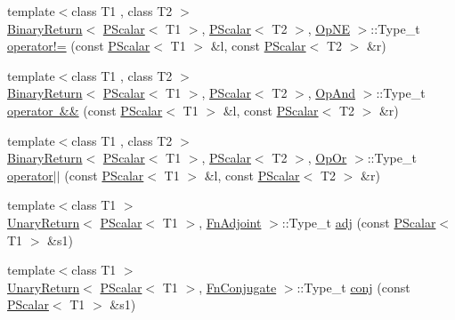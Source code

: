 \begin{DoxyCompactItemize}
\item 
{\footnotesize template$<$class T1 , class T2 $>$ }\\\mbox{\hyperlink{structENSEM_1_1BinaryReturn}{Binary\+Return}}$<$ \mbox{\hyperlink{classENSEM_1_1PScalar}{P\+Scalar}}$<$ T1 $>$, \mbox{\hyperlink{classENSEM_1_1PScalar}{P\+Scalar}}$<$ T2 $>$, \mbox{\hyperlink{structENSEM_1_1OpNE}{Op\+NE}} $>$\+::Type\+\_\+t \mbox{\hyperlink{group__primscalar_ga684a2a9e7e4ca7bc1f740a291a847808}{operator!=}} (const \mbox{\hyperlink{classENSEM_1_1PScalar}{P\+Scalar}}$<$ T1 $>$ \&l, const \mbox{\hyperlink{classENSEM_1_1PScalar}{P\+Scalar}}$<$ T2 $>$ \&r)
\item 
{\footnotesize template$<$class T1 , class T2 $>$ }\\\mbox{\hyperlink{structENSEM_1_1BinaryReturn}{Binary\+Return}}$<$ \mbox{\hyperlink{classENSEM_1_1PScalar}{P\+Scalar}}$<$ T1 $>$, \mbox{\hyperlink{classENSEM_1_1PScalar}{P\+Scalar}}$<$ T2 $>$, \mbox{\hyperlink{structENSEM_1_1OpAnd}{Op\+And}} $>$\+::Type\+\_\+t \mbox{\hyperlink{group__primscalar_ga3853388d3b3d994d263d1da57ffcb055}{operator \&\&}} (const \mbox{\hyperlink{classENSEM_1_1PScalar}{P\+Scalar}}$<$ T1 $>$ \&l, const \mbox{\hyperlink{classENSEM_1_1PScalar}{P\+Scalar}}$<$ T2 $>$ \&r)
\item 
{\footnotesize template$<$class T1 , class T2 $>$ }\\\mbox{\hyperlink{structENSEM_1_1BinaryReturn}{Binary\+Return}}$<$ \mbox{\hyperlink{classENSEM_1_1PScalar}{P\+Scalar}}$<$ T1 $>$, \mbox{\hyperlink{classENSEM_1_1PScalar}{P\+Scalar}}$<$ T2 $>$, \mbox{\hyperlink{structENSEM_1_1OpOr}{Op\+Or}} $>$\+::Type\+\_\+t \mbox{\hyperlink{group__primscalar_ga7955d37fbeaea4b15d725326bfcbc0b1}{operator$\vert$$\vert$}} (const \mbox{\hyperlink{classENSEM_1_1PScalar}{P\+Scalar}}$<$ T1 $>$ \&l, const \mbox{\hyperlink{classENSEM_1_1PScalar}{P\+Scalar}}$<$ T2 $>$ \&r)
\item 
{\footnotesize template$<$class T1 $>$ }\\\mbox{\hyperlink{structENSEM_1_1UnaryReturn}{Unary\+Return}}$<$ \mbox{\hyperlink{classENSEM_1_1PScalar}{P\+Scalar}}$<$ T1 $>$, \mbox{\hyperlink{structENSEM_1_1FnAdjoint}{Fn\+Adjoint}} $>$\+::Type\+\_\+t \mbox{\hyperlink{group__primscalar_ga7014b73d255c4b57001dd68abf3a51c3}{adj}} (const \mbox{\hyperlink{classENSEM_1_1PScalar}{P\+Scalar}}$<$ T1 $>$ \&s1)
\item 
{\footnotesize template$<$class T1 $>$ }\\\mbox{\hyperlink{structENSEM_1_1UnaryReturn}{Unary\+Return}}$<$ \mbox{\hyperlink{classENSEM_1_1PScalar}{P\+Scalar}}$<$ T1 $>$, \mbox{\hyperlink{structENSEM_1_1FnConjugate}{Fn\+Conjugate}} $>$\+::Type\+\_\+t \mbox{\hyperlink{group__primscalar_ga751a721817d2276b8eeda384b67ffa2a}{conj}} (const \mbox{\hyperlink{classENSEM_1_1PScalar}{P\+Scalar}}$<$ T1 $>$ \&s1)

\end{DoxyCompactItemize}
